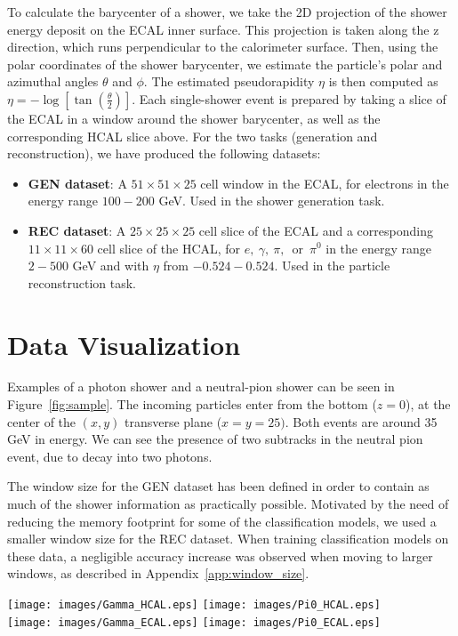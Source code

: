 To calculate the barycenter of a shower, we take the 2D projection of the shower energy deposit on the ECAL inner surface. This projection is taken along the z direction, which runs perpendicular to the calorimeter surface. Then, using the polar coordinates of the shower barycenter, we estimate the particle's polar and azimuthal angles $\theta$ and $\phi$. The estimated pseudorapidity $\eta$ is then computed as $\eta=-\log[\tan\left(\frac{\theta}{2}\right)]$. Each single-shower event is prepared by taking a slice of the ECAL in a window around the shower barycenter, as well as the corresponding HCAL slice above. For the two tasks (generation and reconstruction), we have produced the following datasets:
\begin{itemize}
  \item {\bf GEN dataset}: A $51 \times 51 \times 25$ cell window in the
    ECAL, for electrons in the energy range $100-200$ GeV. Used in the shower generation task.
  \item {\bf REC dataset}: A $25 \times
    25 \times 25$ cell slice of the ECAL
    and a corresponding $11 \times 11 \times 60$ cell slice of the
    HCAL, for $e,~\gamma,~\pi,$~or~$\pi^0$ in the energy range $2-500$ GeV and with $\eta$ from $-0.524-0.524$. Used in the particle reconstruction task.
\end{itemize}

\section{Data Visualization}

Examples of a photon shower and a neutral-pion shower can be seen in Figure~\ref{fig:sample}. The incoming particles enter from the bottom ($z=0$), at the center of the $(x,y)$ transverse plane ($x=y=25)$. Both events are around 35 GeV in energy. We can see the presence of two subtracks in the neutral pion event, due to decay into two photons. %

The window size for the GEN dataset has been defined in order to contain as much of the shower information as practically possible.  
Motivated by the need of reducing the memory footprint for some of the classification models, we used a smaller window size for the REC dataset. When training classification models on these data, a negligible accuracy increase was observed when moving to larger windows, as described in Appendix~\ref{app:window_size}.

\begin{figure*}[htbp]
\centering
\texttt{[image: images/Gamma\_HCAL.eps]}
\texttt{[image: images/Pi0\_HCAL.eps]} \\
\texttt{[image: images/Gamma\_ECAL.eps]}
\texttt{[image: images/Pi0\_ECAL.eps]}
\caption{3D image of a photon (left) and neutral pion (right) shower in ECAL (bottom) and HCAL (top).}
\label{fig:sample}
\end{figure*}

